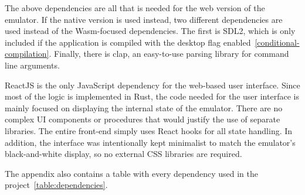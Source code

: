 The above dependencies are all that is needed for the web version of the emulator. If the native version is used instead, two different dependencies are used instead of the Wasm-focused dependencies.
The first is SDL2, which is only included if the application is compiled with the desktop flag enabled~\ref{conditional-compilation}.
Finally, there is clap, an easy-to-use parsing library for command line arguments.


ReactJS is the only JavaScript dependency for the web-based user interface.
Since most of the logic is implemented in Rust, the code needed for the user interface is mainly focused on displaying the internal state of the emulator.
There are no complex UI components or procedures that would justify the use of separate libraries.
The entire front-end simply uses React hooks for all state handling.
In addition, the interface was intentionally kept minimalist to match the emulator's black-and-white display, so no external CSS libraries are required.

The appendix also contains a table with every dependency used in the project~\ref{table:dependencies}.
